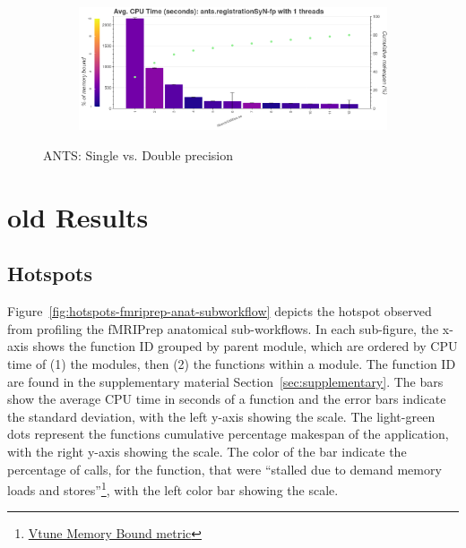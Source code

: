 \documentclass[conference]{IEEEtran}
\begin{document}
\begin{figure}[ht!]
\begin{subfigure}[t]{0.49\textwidth}
		\caption{}
		\label{subfig:hotspots-ants-registrationSyN-fp}
		\includegraphics[width=\textwidth]{figures/hotspots-1thread-ants-registrationSyN-fp.png}
	\end{subfigure}
	\caption{ANTS: Single vs. Double precision}
	\label{fig:ants-fp-comparison}
\end{figure}
					
\section{old Results}
					
		
					
\subsection{Hotspots}
Figure~\ref{fig:hotspots-fmriprep-anat-subworkflow} depicts the hotspot observed from profiling the fMRIPrep anatomical sub-workflows. In each sub-figure, the x-axis shows the function ID grouped by parent module, which are ordered by CPU time of (1) the modules, then (2) the functions within a module. The function ID are found in the supplementary material Section~\ref{sec:supplementary}. The bars show the average CPU time in seconds of a function and the error bars indicate the standard deviation, with the left y-axis showing the scale. The light-green dots represent the functions cumulative percentage makespan of the application, with the right y-axis showing the scale. The color of the bar indicate the percentage of calls, for the function, that were ``stalled due to demand memory loads and stores''\footnote{\href{https://www.intel.com/content/www/us/en/docs/vtune-profiler/user-guide/2023-0/cpu-metrics-reference.html\#MEMORY-BOUND}{Vtune Memory Bound metric}}, with the left color bar showing the scale.
					
\end{document}
